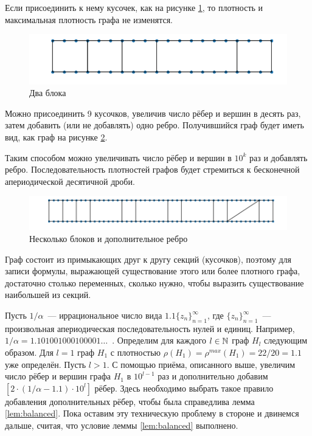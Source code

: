 Если присоединить к нему кусочек, как на рисунке \ref{fig:2 blocks}, то плотность и максимальная плотность графа не изменятся.

\begin{figure}
  \centering
  \includegraphics[scale=0.5]{picrel/2_blocks.png}
  \caption{Два блока}
  \label{fig:2 blocks}
\end{figure}

Можно присоединить 9 кусочков, увеличив число рёбер и 
вершин в десять раз, затем добавить (или не добавлять) одно ребро. Получившийся граф будет иметь вид, как граф на рисунке \ref{fig:additional edge}.

Таким способом можно увеличивать число рёбер и вершин в $10^k$ раз и добавлять ребро.
Последовательность плотностей графов будет стремиться к бесконечной апериодической десятичной дроби.

\begin{figure}
  \includegraphics[scale=0.5]{picrel/additional_edge.png}
  \caption{Несколько блоков и дополнительное ребро}
  \label{fig:additional edge}
\end{figure}

Граф состоит из примыкающих друг к другу секций (кусочков), поэтому для записи формулы, выражающей существование этого или более плотного графа, достаточно столько переменных, сколько нужно, чтобы выразить существование наибольшей из секций.


Пусть $1/\alpha$~--- иррациональное число вида $1.1\{z_n\}_{n=1}^\infty$, где $\{z_n\}_{n=1}^\infty$~--- произвольная апериодическая последовательность нулей и единиц. Например, $1/\alpha = 1.101001000100001\ldots$~.
Определим для каждого $l \in \mathbb {N}$ граф $H_l$ следующим образом.
Для $l = 1$ граф $H_1$ с плотностью $\rho(H_1) = \rho^{max}(H_1) = 22/20 = 1.1$  уже определён.
Пусть $l > 1$.
С помощью приёма, описанного выше, увеличим число рёбер и вершин графа $H_1$ в 
$10^{l-1}$ раз и дополнительно добавим $[2\cdot(1/\alpha - 1.1)\cdot 10^{l}]$ рёбер.
Здесь необходимо выбрать такое правило добавления дополнительных рёбер, чтобы была справедлива лемма \ref{lem:balanced}.
Пока оставим эту техническую проблему в стороне и двинемся дальше, считая, что условие леммы \ref{lem:balanced} выполнено.

